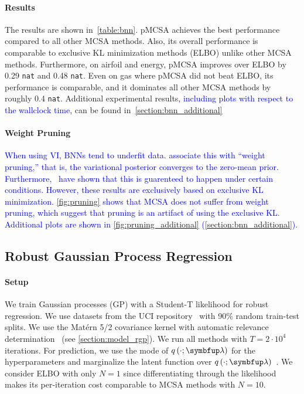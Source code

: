\vspace{-1.5ex}
\paragraph{Results}
The results are shown in~\cref{table:bnn}.
pMCSA achieves the best performance compared to all other MCSA methods.
Also, its overall performance is comparable to exclusive KL minimization methods (ELBO) unlike other MCSA methods.
Furthermore, on \textsf{airfoil} and \textsf{energy}, pMCSA improves over ELBO by 0.29 \texttt{nat} and 0.48 \texttt{nat}.
Even on \textsf{gas} where pMCSA did not beat ELBO, its performance is comparable, and it dominates all other MCSA methods by roughly 0.4 \texttt{nat}.
Additional experimental results, \textcolor{blue}{including plots with respect to the wallclock time}, can be found in~\cref{section:bnn_additional}

\vspace{-1.5ex}
\paragraph{Weight Pruning}
\textcolor{blue}{
When using VI, BNNs tend to underfit data.
\citet{mackay_local_2001,pmlr-v70-hoffman17a,trippe_overpruning_2017} associate this with ``weight pruning,'' that is, the variational posterior converges to the zero-mean prior.
Furthermore,~\citet{coker_wide_2022,huix_variational_2022} have shown that this is guarenteed to happen under certain conditions.
However, these results are exclusively based on exclusive KL minimization.
\cref{fig:pruning} shows that MCSA does not suffer from weight pruning, which suggest that pruning is an artifact of using the exclusive KL.
Additional plots are shown in \cref{fig:pruning_additional} (\cref{section:bnn_additional}).
}%
%



\vspace{-1.5ex}
\subsection{Robust Gaussian Process Regression}\label{section:bgp}
\vspace{-1.5ex}
\paragraph{Setup}
We train Gaussian processes (GP) with a Student-T likelihood for robust regression.
We use datasets from the UCI repository~\citep{Dua:2019} with 90\% random train-test splits.
We use the Mat\'ern 5/2 covariance kernel with automatic relevance determination~\citep{neal_bayesian_1996} (see \cref{section:model_rgp}).
We run all methods with \(T=2\cdot10^4\) iterations.
For prediction, we use the mode of \(q\left(\cdot; \vlambda\right)\) for the hyperparameters and marginalize the latent function over \(q\left(\cdot; \vlambda\right)\)~\citep{rasmussen_gaussian_2006}.
We consider ELBO with only \(N=1\) since differentiating through the likelihood makes its per-iteration cost comparable to MCSA methods with \(N=10\).

